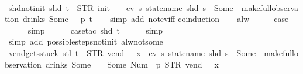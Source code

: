 \begin{isabellebody}
%
\isadelimproof
\ \ %
\endisadelimproof
%
\isatagproof
{}\isamarkupfalse%
%
\endisatagproof
{\isafoldproof}%
%
\isadelimproof
\isanewline
%
\endisadelimproof
\isanewline
{}\isamarkupfalse%
\ shd{\isacharunderscore}not{\isacharunderscore}init{\isacharcolon}\ {\isachardoublequoteopen}shd\ t\ {\isasymnoteq}\ {\isacharparenleft}STR\ {\isacharprime}{\isacharprime}init{\isacharprime}{\isacharprime}{\isacharcomma}\ {\isacharbrackleft}{\isacharbrackright}{\isacharparenright}\ {\isasymLongrightarrow}\ {\isasymnot}\ ev\ {\isacharparenleft}{\isasymlambda}s{\isachardot}\ statename\ {\isacharparenleft}shd\ s{\isacharparenright}\ {\isacharequal}\ Some\ {}{\isacharparenright}\ {\isacharparenleft}make{\isacharunderscore}full{\isacharunderscore}observation\ drinks\ {\isacharparenleft}Some\ {}{\isacharparenright}\ {\isacharless}{\isachargreater}\ p\ t{\isacharparenright}{\isachardoublequoteclose}\isanewline
%
\isadelimproof
\ \ %
\endisadelimproof
%
\isatagproof
{}\isamarkupfalse%
\ {\isacharparenleft}simp\ add{\isacharcolon}\ not{\isacharunderscore}ev{\isacharunderscore}iff{\isacharparenright}\isanewline
{}\isamarkupfalse%
{\isacharparenleft}coinduction{\isacharparenright}\isanewline
\ \ \isamarkupfalse%
\ alw\isanewline
\ \ \isamarkupfalse%
\ \isamarkupfalse%
\ {\isacharquery}case\isanewline
\ \ \ \ \isamarkupfalse%
\ simp\isanewline
\ \ \ \ \isamarkupfalse%
\ {\isacharparenleft}case{\isacharunderscore}tac\ {\isachardoublequoteopen}shd\ t{\isachardoublequoteclose}{\isacharparenright}\isanewline
\ \ \ \ \isamarkupfalse%
\ simp\isanewline
\ \ \ \ \isamarkupfalse%
\ {\isacharparenleft}simp\ add{\isacharcolon}\ possible{\isacharunderscore}steps{\isacharunderscore}not{\isacharunderscore}init\ alw{\isacharunderscore}not{\isacharunderscore}some{\isacharparenright}\isanewline
{}\isamarkupfalse%
%
\endisatagproof
{\isafoldproof}%
%
\isadelimproof
\isanewline
%
\endisadelimproof
\isanewline
{}\isamarkupfalse%
\ vend{\isacharunderscore}gets{\isacharunderscore}stuck{\isacharcolon}\ {\isachardoublequoteopen}stl\ t\ {\isacharequal}\ {\isacharparenleft}STR\ {\isacharprime}{\isacharprime}vend{\isacharprime}{\isacharprime}{\isacharcomma}\ {\isacharbrackleft}{\isacharbrackright}{\isacharparenright}\ {\isacharhash}{\isacharhash}\ x{}\ {\isasymLongrightarrow}\ {\isasymnot}ev\ {\isacharparenleft}{\isasymlambda}s{\isachardot}\ statename\ {\isacharparenleft}shd\ s{\isacharparenright}\ {\isacharequal}\ Some\ {}{\isacharparenright}\ {\isacharparenleft}make{\isacharunderscore}full{\isacharunderscore}observation\ drinks\ {\isacharparenleft}Some\ {}{\isacharparenright}\ {\isacharless}{}\ {\isachardollar}{\isacharcolon}{\isacharequal}\ Some\ {\isacharparenleft}Num\ {}{\isacharparenright}{\isachargreater}\ p\ {\isacharparenleft}{\isacharparenleft}STR\ {\isacharprime}{\isacharprime}vend{\isacharprime}{\isacharprime}{\isacharcomma}\ {\isacharbrackleft}{\isacharbrackright}{\isacharparenright}\ {\isacharhash}{\isacharhash}\ x{}{\isacharparenright}{\isacharparenright}{\isachardoublequoteclose}\isanewline

\end{isabellebody}
